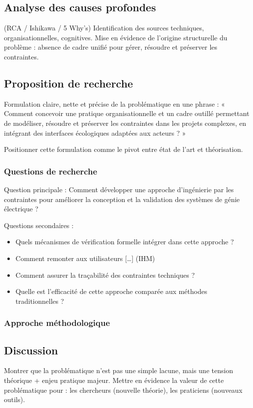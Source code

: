 \documentclass[a4paper,12pt]{article}
\begin{document}
\subsection{Analyse des causes profondes}
\label{sec:org76b55dc}
(RCA / Ishikawa / 5 Why’s)
Identification des sources techniques, organisationnelles, cognitives.
Mise en évidence de l’origine structurelle du problème : absence de cadre unifié pour gérer, résoudre et préserver les contraintes.
\subsection{Proposition de recherche}
\label{sec:org0ba41ff}
Formulation claire, nette et précise de la problématique en une phrase :
« Comment concevoir une pratique organisationnelle et un cadre outillé permettant de modéliser, résoudre et préserver les contraintes dans les projets complexes, en intégrant des interfaces écologiques adaptées aux acteurs ? »

Positionner cette formulation comme le pivot entre état de l’art et théorisation.
\subsubsection{Questions de recherche}
\label{sec:orgbbd7ba8}
Question principale : Comment développer une approche d'ingénierie par les contraintes pour améliorer la conception et la validation des systèmes de génie électrique ?

Questions secondaires :
\begin{itemize}
\item Quels mécanismes de vérification formelle intégrer dans cette approche ?
\item Comment remonter aux utilisateurs [\ldots{}] (IHM)
\item Comment assurer la traçabilité des contraintes techniques ?
\item Quelle est l'efficacité de cette approche comparée aux méthodes traditionnelles ?
\end{itemize}
\subsubsection{Approche méthodologique}
\label{sec:orga0a6261}
\subsection{Discussion}
\label{sec:org8b7848f}
Montrer que la problématique n’est pas une simple lacune, mais une tension théorique + enjeu pratique majeur.
Mettre en évidence la valeur de cette problématique pour :
les chercheurs (nouvelle théorie),
les praticiens (nouveaux outils).
\end{document}
